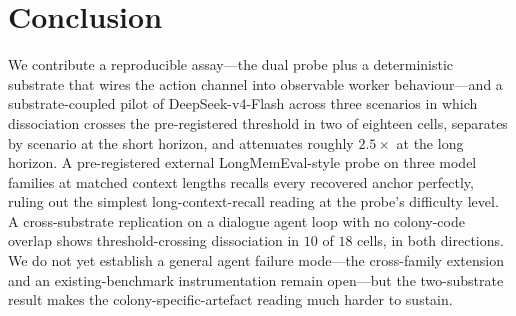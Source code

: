 \section{Conclusion}
\label{sec:conclusion}

We contribute a reproducible assay---the dual probe plus a
deterministic substrate that wires the action channel into
observable worker behaviour---and a substrate-coupled pilot of
DeepSeek-v4-Flash across three scenarios in which dissociation
crosses the pre-registered threshold in two of eighteen cells,
separates by scenario at the short horizon, and attenuates
roughly $2.5\times$ at the long horizon. A pre-registered
external LongMemEval-style probe on three model families at
matched context lengths recalls every recovered anchor perfectly,
ruling out the simplest long-context-recall reading at the
probe's difficulty level. A cross-substrate replication on a
dialogue agent loop with no colony-code overlap shows
threshold-crossing dissociation in $10$ of $18$ cells, in both
directions. We do not yet establish a general agent failure
mode---the cross-family extension and an existing-benchmark
instrumentation remain open---but the two-substrate result
makes the colony-specific-artefact reading much harder to
sustain.
